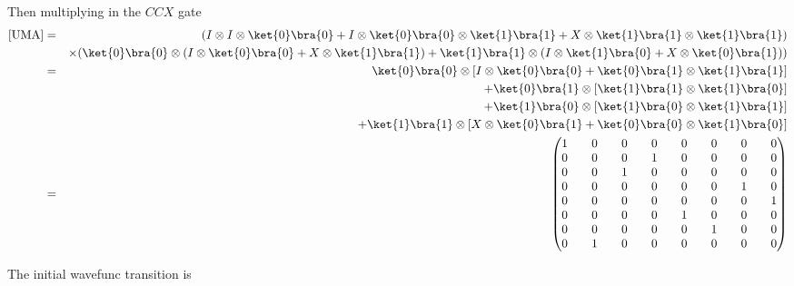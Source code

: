 \documentclass[preprint,aps,prd,nofootinbib,superscriptaddress]{revtex4-2}
\begin{document}
Then multiplying in the $CCX$ gate
\begin{eqnarray}
\text{[UMA]}  &=& (I \otimes I \otimes \ket{0}\bra{0} + I \otimes \ket{0}\bra{0} \otimes \ket{1}\bra{1} + X \otimes \ket{1}\bra{1} \otimes \ket{1}\bra{1})
\nonumber \\
&& \times(\ket{0}\bra{0} \otimes (I \otimes \ket{0}\bra{0} + X \otimes \ket{1}\bra{1})
+ \ket{1}\bra{1} \otimes (I \otimes \ket{1}\bra{0}  + X \otimes \ket{0}\bra{1}))
\nonumber \\
&=& \ket{0}\bra{0} \otimes \left[I \otimes \ket{0}\bra{0} + \ket{0}\bra{1} \otimes \ket{1}\bra{1}\right] 
\nonumber \\
&& + \ket{0}\bra{1} \otimes \left[\ket{1}\bra{1} \otimes \ket{1}\bra{0}\right]
\nonumber \\
&& + \ket{1}\bra{0} \otimes \left[\ket{1}\bra{0} \otimes \ket{1}\bra{1}\right]
\nonumber \\
&& + \ket{1}\bra{1} \otimes \left[X \otimes \ket{0}\bra{1}+ \ket{0}\bra{0} \otimes \ket{1}\bra{0}\right]
\nonumber \\
&=& 
\begin{pmatrix}
1 \quad & 0 \quad & 0 \quad & 0 \quad & 0 \quad & 0 \quad & 0 \quad & 0 \\
0 \quad & 0 \quad & 0 \quad & 1 \quad & 0 \quad & 0 \quad & 0 \quad & 0 \\
0 \quad & 0 \quad & 1 \quad & 0 \quad & 0 \quad & 0 \quad & 0 \quad & 0 \\
0 \quad & 0 \quad & 0 \quad & 0 \quad & 0 \quad & 0 \quad & 1 \quad & 0 \\
0 \quad & 0 \quad & 0 \quad & 0 \quad & 0 \quad & 0 \quad & 0 \quad & 1 \\
0 \quad & 0 \quad & 0 \quad & 0 \quad & 1 \quad & 0 \quad & 0 \quad & 0 \\
0 \quad & 0 \quad & 0 \quad & 0 \quad & 0 \quad & 1 \quad & 0 \quad & 0 \\
0 \quad & 1 \quad & 0 \quad & 0 \quad & 0 \quad & 0 \quad & 0 \quad & 0
\end{pmatrix}
\end{eqnarray}

The initial wavefunc transition is
\end{document}
